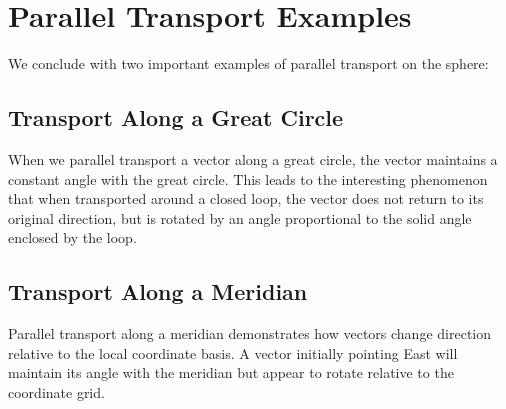 \documentclass[12pt]{article}
\begin{document}
\section{Parallel Transport Examples}
We conclude with two important examples of parallel transport on the sphere:

\subsection{Transport Along a Great Circle}
When we parallel transport a vector along a great circle, the vector maintains a constant angle with the great circle. This leads to the interesting phenomenon that when transported around a closed loop, the vector does not return to its original direction, but is rotated by an angle proportional to the solid angle enclosed by the loop.

\subsection{Transport Along a Meridian}
Parallel transport along a meridian demonstrates how vectors change direction relative to the local coordinate basis. A vector initially pointing East will maintain its angle with the meridian but appear to rotate relative to the coordinate grid.
\end{document}
